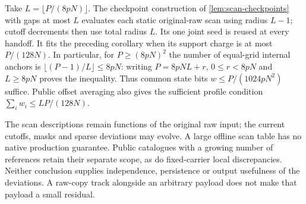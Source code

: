 Take $L=\lfloor P/(8pN)\rfloor$. The checkpoint construction of
\cref{lem:scan-checkpoints} with gaps at most $L$ evaluates each static
original-raw scan using radius $L-1$; cutoff decrements then use total radius
$L$. Its one joint seed is reused at every handoff. It fits the preceding
corollary when its support charge is at most $P/(128N)$. In particular,
for $P\ge(8pN)^2$ the number of equal-grid internal anchors is
$\lfloor(P-1)/L\rfloor\le8pN$: writing $P=8pN L+r$, $0\le r<8pN$
and $L\ge8pN$ proves the inequality. Thus common state bits
$w\le P/(1024pN^2)$ suffice. Public offset averaging also gives the
sufficient profile condition $\sum_i w_i\le LP/(128N)$.

The scan descriptions remain functions of the original raw input; the
current cutoffs, masks and sparse deviations may evolve. A large offline
scan table has no native production guarantee. Public catalogues with a
growing number of references retain their separate scope, as do fixed-carrier
local discrepancies. Neither conclusion supplies independence, persistence
or output usefulness of the deviations. A raw-copy track alongside an
arbitrary payload does not make that payload a small residual.
